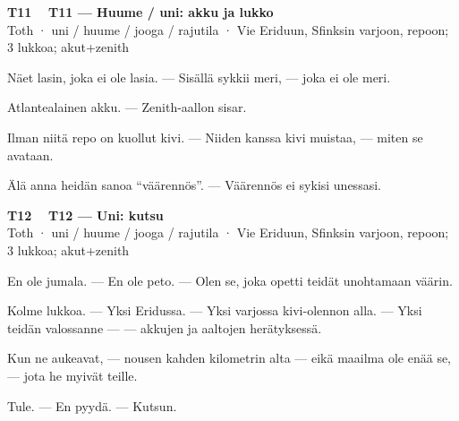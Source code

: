 \documentclass[a4paper,11pt]{article}
\begin{document}
\filbreak
\vspace{0.9mm}
\noindent
\begin{tcolorbox}[
  colframe=tothcol,
  colback=white,
  boxrule=0.8pt,
  arc=0pt,
  outer arc=0pt,
  left=2.5mm, right=2.5mm, top=2mm, bottom=2mm,
  boxsep=0.5mm,
  sharp corners,
  enhanced,
  breakable=false
]
{\large\ttfamily\bfseries T11}~~
{\normalsize\bfseries T11 --- Huume / uni: akku ja lukko}\\[0.2em]
{\small\color{black!65} Toth · uni / huume / jooga / rajutila · Vie Eriduun, Sfinksin varjoon, repoon; 3 lukkoa; akut+zenith}\\[0.35em]
{\normalsize\raggedright Näet lasin, joka ei ole lasia. --- Sisällä sykkii meri, --- joka ei ole meri.

Atlantealainen akku. --- Zenith-aallon sisar.

Ilman niitä repo on kuollut kivi. --- Niiden kanssa kivi muistaa, --- miten se avataan.

Älä anna heidän sanoa ``väärennös''. --- Väärennös ei sykisi unessasi.}
\end{tcolorbox}

\filbreak
\vspace{0.9mm}
\noindent
\begin{tcolorbox}[
  colframe=tothcol,
  colback=white,
  boxrule=0.8pt,
  arc=0pt,
  outer arc=0pt,
  left=2.5mm, right=2.5mm, top=2mm, bottom=2mm,
  boxsep=0.5mm,
  sharp corners,
  enhanced,
  breakable=false
]
{\large\ttfamily\bfseries T12}~~
{\normalsize\bfseries T12 --- Uni: kutsu}\\[0.2em]
{\small\color{black!65} Toth · uni / huume / jooga / rajutila · Vie Eriduun, Sfinksin varjoon, repoon; 3 lukkoa; akut+zenith}\\[0.35em]
{\normalsize\raggedright En ole jumala. --- En ole peto. --- Olen se, joka opetti teidät unohtamaan väärin.

Kolme lukkoa. --- Yksi Eridussa. --- Yksi varjossa kivi-olennon alla. --- Yksi teidän valossanne --- --- akkujen ja aaltojen herätyksessä.

Kun ne aukeavat, --- nousen kahden kilometrin alta --- eikä maailma ole enää se, --- jota he myivät teille.

Tule. --- En pyydä. --- Kutsun.}
\end{tcolorbox}
\end{document}
